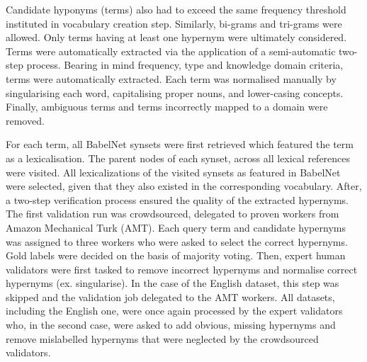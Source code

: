 Candidate hyponyms (terms) also had to exceed the same frequency threshold instituted in vocabulary creation step.  Similarly, bi-grams and tri-grams were allowed.  Only terms having at least one hypernym were ultimately considered.  Terms were automatically extracted via the application of a semi-automatic two-step process.  Bearing in mind frequency, type and knowledge domain criteria, terms were automatically extracted.  Each term was normalised manually by singularising each word, capitalising proper nouns, and lower-casing concepts.  Finally, ambiguous terms and terms incorrectly mapped to a domain were removed.

For each term, all BabelNet \citep{navigli2012babelnet} synsets were first retrieved which featured the term as a lexicalisation.  The parent nodes of each synset, across all lexical references were visited.  All lexicalizations of the visited synsets as featured in BabelNet were selected, given that they also existed in the corresponding vocabulary.
After, a two-step verification process ensured the quality of the extracted hypernyms.  The first validation run was crowdsourced, delegated to proven workers from Amazon Mechanical Turk (AMT).  Each query term and candidate hypernyms was assigned to three workers who were asked to select the correct hypernyms.  Gold labels were decided on the basis of majority voting.  Then, expert human validators were first tasked to remove incorrect hypernyms and normalise correct hypernyms (ex. singularise).  In the case of the English dataset, this step was skipped and the validation job delegated to the AMT workers.  All datasets, including the English one, were once again processed by the expert validators who, in the second case, were asked to add obvious, missing hypernyms and remove mislabelled hypernyms that were neglected by the crowdsourced validators.


